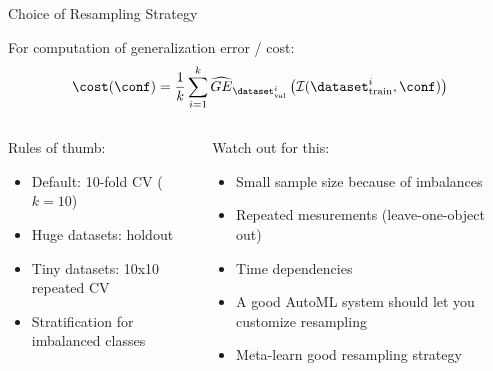 \begin{frame}{Choice of Resampling Strategy}
  
  For computation of generalization error / cost:
  \begin{equation*}
    \cost(\conf) = \frac{1}{k}\sum_{i = 1}^k \widehat{GE}_{\dataset_{\text{val}}^i}\left(\inducer(\dataset_{\text{train}}^i, \conf)\right)
  \end{equation*}

  \vspace{1em}
  \begin{columns}
    \begin{column}{0.5\textwidth}
    Rules of thumb:
    \begin{itemize}
      \item Default: 10-fold CV ($k=10$)
      \item Huge datasets: holdout
      \item Tiny datasets: 10x10 repeated CV
      \item Stratification for imbalanced classes
    \end{itemize}
    \end{column}
    
    \begin{column}{0.5\textwidth}
    	\pause
 Watch out for this:       
    \begin{itemize}
      \item Small sample size because of imbalances    
      \item Repeated mesurements (leave-one-object out)
      \item Time dependencies
      \item A good AutoML system should let you customize resampling
      \item Meta-learn good resampling strategy~
    \end{itemize}
    \end{column}
    \end{columns}
    
\end{frame}


